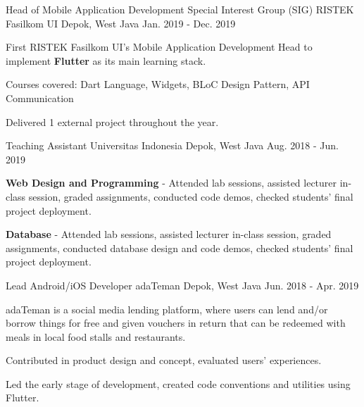 \begin{cventries}
  \cventry
    {Head of Mobile Application Development Special Interest Group (SIG)} %
    {RISTEK Fasilkom UI} %
    {Depok, West Java} %
    {Jan. 2019 - Dec. 2019} %
    {
      \begin{cvitems} %
        \item First RISTEK Fasilkom UI's Mobile Application Development Head to implement \textbf{Flutter} as its main learning stack.
        \item Courses covered: Dart Language, Widgets, BLoC Design Pattern, API Communication
        \item Delivered 1 external project throughout the year.
      \end{cvitems}
    }
    
  \cventry
    {Teaching Assistant}
    {Universitas Indonesia}
    {Depok, West Java}
    {Aug. 2018 - Jun. 2019}
    {
      \begin{cvitems}
        \item \textbf{Web Design and Programming} - Attended lab sessions, assisted lecturer in-class session, graded assignments, conducted code demos, checked students' final project deployment.
        \item \textbf{Database} - Attended lab sessions, assisted lecturer in-class session, graded assignments, conducted database design and code demos, checked students' final project deployment.
      \end{cvitems}
    }
    
  \cventry
    {Lead Android/iOS Developer}
    {adaTeman}
    {Depok, West Java}
    {Jun. 2018 - Apr. 2019}
    {
      \begin{cvitems}
        \item adaTeman is a social media lending platform, where users can lend and/or borrow things for free and given vouchers in return that can be redeemed with meals in local food stalls and restaurants.
        \item Contributed in product design and concept, evaluated users' experiences.
        \item Led the early stage of development, created code conventions and utilities using Flutter.
      \end{cvitems}
    }
\end{cventries}
